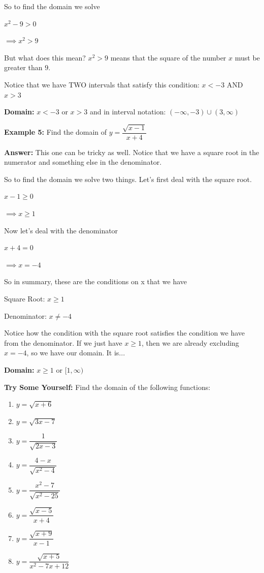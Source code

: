 \documentclass[12pt]{article}
\begin{document}
\begin{enumerate}
So to find the domain we solve

\hspace{.3cm}$x^2-9 > 0$

$\implies x^2 > 9$

But what does this mean? $x^2>9$ means that the square of the number $x$ must be greater than $9$.

Notice that we have TWO intervals that satisfy this condition: $x<-3$ AND $x>3$

\textbf{Domain:} $x<-3$ or $x > 3$   and in interval notation: $(-\infty, -3) \cup (3, \infty)$

\textbf{Example 5:} Find the domain of $y = \dfrac{\sqrt{x-1}}{x+4}$

\textbf{Answer:} This one can be tricky as well. Notice that we have a square root in the numerator and something else in the denominator.

So to find the domain we solve two things. Let's first deal with the square root.

\hspace{.3cm}$x-1 \geq 0$

$\implies x \geq 1$
 
Now let's deal with the denominator

\hspace{.3cm}$x+4 =0$

$\implies x = -4$

So in summary, these are the conditions on x that we have

Square Root: $x \geq 1$

Denominator: $x \neq -4$

Notice how the condition with the square root satisfies the condition we have from the denominator. If we just have $x \geq 1$, then we are already excluding $x = -4$, so we have our domain. It is...

\textbf{Domain:} $x \geq 1$ or $[1, \infty)$

\textbf{Try Some Yourself:} Find the domain of the following functions:

\begin{enumerate}
\item $y = \sqrt{x+6}$
\item $y = \sqrt{3x-7}$
\item $y = \dfrac{1}{\sqrt{2x-3}}$
\item $y = \dfrac{4-x}{\sqrt{x^2-4}}$
\item $y = \dfrac{x^2-7}{\sqrt{x^2-25}}$
\item $y = \dfrac{\sqrt{x-5}}{x+4}$
\item $y = \dfrac{\sqrt{x+9}}{x-1}$
\item $y = \dfrac{\sqrt{x+5}}{x^2-7x+12}$
\end{enumerate}
\end{enumerate}
\end{document}
